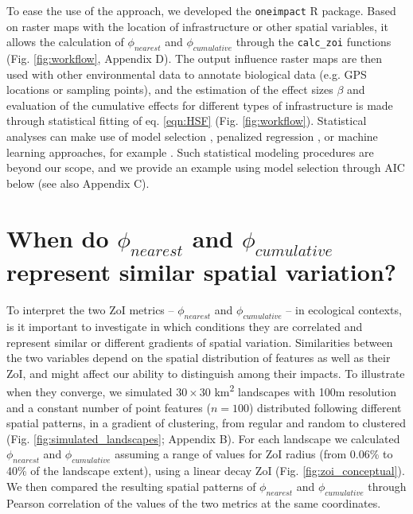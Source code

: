 \documentclass[titlepage]{article}
\begin{document}
To ease the use of the approach, we developed the \verb|oneimpact| R package. Based on raster maps with the location of infrastructure or other spatial variables, it allows the calculation of $\phi_{nearest}$ and $\phi_{cumulative}$ through the \verb|calc_zoi| functions (Fig. \ref{fig:workflow}, Appendix D). The output influence raster maps are then used with other environmental data to annotate biological data (e.g. GPS locations or sampling points), and the estimation of the effect sizes $\beta$ and evaluation of the cumulative effects for different types of infrastructure is made through statistical fitting of eq. \ref{eqn:HSF} (Fig. \ref{fig:workflow}). Statistical analyses can make use of model selection \citep{burnham_model_2002}, penalized regression \citep{lee_estimating_2020}, or machine learning approaches, for example \citep[Appendix D]{james_introduction_2021}. Such statistical modeling procedures are beyond our scope, and we provide an example using model selection through AIC below (see also Appendix C). 

\section{When do $\phi_{nearest}$ and $\phi_{cumulative}$ represent similar spatial variation?}

To interpret the two ZoI metrics -- $\phi_{nearest}$ and $\phi_{cumulative}$ -- in ecological contexts, is it important to investigate in which conditions they are correlated and represent similar or different gradients of spatial variation. Similarities between the two variables depend on the spatial distribution of features as well as their ZoI, and might affect our ability to distinguish among their impacts. To illustrate when they converge, we simulated $30 \times 30$ km\textsuperscript{2} landscapes with 100m resolution and a constant number of point features ($n = 100$) distributed following different spatial patterns, in a gradient of clustering, from regular and random to clustered (Fig. \ref{fig:simulated_landscapes}; Appendix B). For each landscape we calculated $\phi_{nearest}$ and $\phi_{cumulative}$ assuming a range of values for ZoI radius (from 0.06\% to 40\% of the landscape extent), using a linear decay ZoI (Fig. \ref{fig:zoi_conceptual}). We then compared the resulting spatial patterns of $\phi_{nearest}$ and $\phi_{cumulative}$ through Pearson correlation of the values of the two metrics at the same coordinates. 
\end{document}
